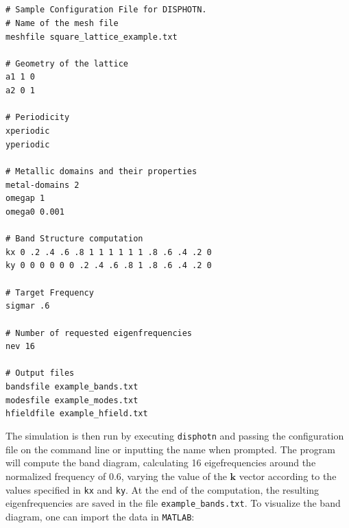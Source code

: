 \documentclass[11pt,a4paper,oneside]{article}
\begin{document}
{\tt \\ \\
\# Sample Configuration File for DISPHOTN. \\
\# Name of the mesh file \\
meshfile square\_lattice\_example.txt \\
\\
\# Geometry of the lattice \\
a1 1 0 \\
a2 0 1 \\
\\
\# Periodicity \\
xperiodic \\
yperiodic \\
 \\
\# Metallic domains and their properties \\
metal-domains 2 \\
omegap 1 \\
omega0 0.001 \\
 \\
\# Band Structure computation \\
kx 0 .2 .4 .6 .8 1 1  1  1  1  1 .8 .6 .4 .2 0 \\
ky 0 0  0  0  0  0 .2 .4 .6 .8 1 .8 .6 .4 .2 0 \\
\\
\# Target Frequency \\
sigmar .6\\
 \\
\# Number of requested eigenfrequencies \\
nev 16\\
\\
\# Output files\\
bandsfile example\_bands.txt\\
modesfile example\_modes.txt\\
hfieldfile example\_hfield.txt\\
}

The simulation is then run by executing {\tt disphotn} and passing the configuration file on the command line or inputting the name when prompted. The program will compute the band diagram, calculating 16 eigefrequencies around the normalized frequency of 0.6, varying the value of the $\boldsymbol{k}$ vector according to the values specified in {\tt kx} and {\tt ky}. At the end of the computation, the resulting eigenfrequencies are saved in the file {\tt example\_bands.txt}. To visualize the band diagram, one can import the data in {\tt MATLAB}:
\end{document}
